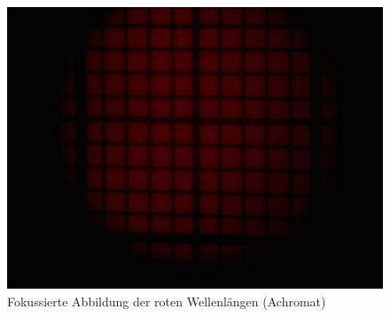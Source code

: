 \begin{figure}[htb]
\begin{minipage}[t]{0.32\textwidth}
		\includegraphics[clip=true, trim=700px 950px 900px 250px, width=\linewidth]{img/ChromAbb/Prakt_Linsenfehler_2015_06_04_073}
		\caption{Fokussierte Abbildung der roten Wellenlängen (Achromat)}
		\label{fig:cm_rot_achromat}
	\end{minipage}
\end{figure}



